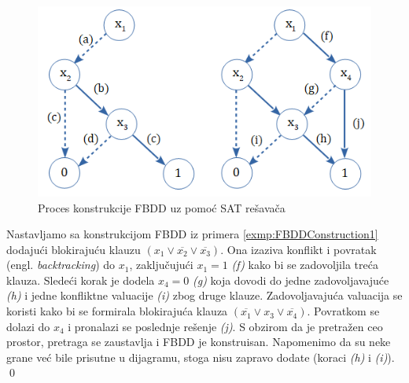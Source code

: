 \begin{figure}[H]
    \centering
    \includegraphics[scale=0.8]{slike/FBDD_Construction.PNG}
    \caption{Proces konstrukcije FBDD uz pomo\'c{} SAT re\v{s}ava\v{c}a}
    \label{diag:FBDDConstruction}
\end{figure}

\begin{exmp}
    Nastavljamo sa konstrukcijom FBDD iz primera \ref{exmp:FBDDConstruction1} dodaju\'c{}i blokiraju\'c{}u klauzu $(x_{1} \vee \overline{x_{2}} \vee \overline{x_{3}})$. Ona izaziva konflikt i povratak (engl. \emph{backtracking}) do $x_{1}$, zaklju\v{c}uju\'c{}i $x_{1} = 1$ \textit{(f)} kako bi se zadovoljila tre\'c{}a klauza. Slede\'c{}i korak je dodela $x_{4} = 0$ \textit{(g)} koja dovodi do jedne zadovoljavaju\'c{}e \textit{(h)} i jedne konfliktne valuacije \textit{(i)} zbog druge klauze. Zadovoljavaju\'c{}a valuacija se koristi kako bi se formirala blokiraju\'c{}a klauza $(\overline{x_{1}} \vee x_{3} \vee \overline{x_{4}})$. Povratkom se dolazi do $x_{4}$ i pronalazi se poslednje re\v{s}enje \textit{(j)}. S obzirom da je pretra\v{z}en ceo prostor, pretraga se zaustavlja i FBDD je konstruisan. Napomenimo da su neke grane ve\'c{} bile prisutne u dijagramu, stoga nisu zapravo dodate (koraci \textit{(h)} i \textit{(i)}).
    \label{exmp:FBDDConstruction2}
    \qed
\end{exmp}

